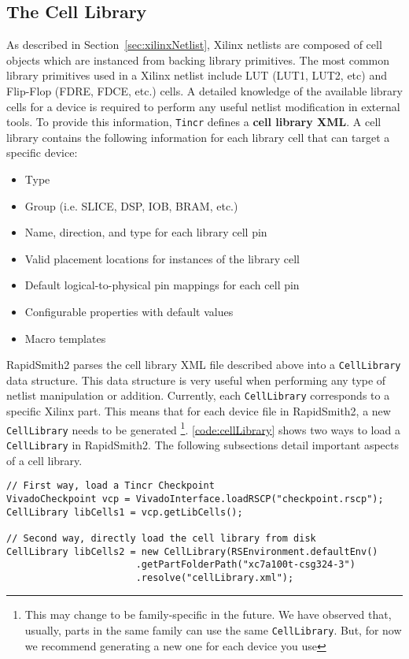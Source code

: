 \subsection{The Cell Library} \label{sec:cellLibraryinDesignSection}
As described in Section~\ref{sec:xilinxNetlist}, Xilinx netlists are composed of
cell objects which are instanced from backing library primitives. The most
common library primitives used in a Xilinx netlist include LUT (LUT1,
LUT2, etc) and Flip-Flop (FDRE, FDCE, etc.) cells. A detailed knowledge of the
available library cells for a device is required to perform any useful netlist
modification in external tools. To provide this information, \texttt{Tincr}
defines a \textbf{cell library XML}. A cell library contains the
following information for each library cell that can target a specific device:

\begin {itemize}
  \item Type
  \item Group (i.e. SLICE, DSP, IOB, BRAM, etc.) 
  \item Name, direction, and type for each library cell pin
  \item Valid placement locations for instances of the library cell
  \item Default logical-to-physical pin mappings for each cell pin
  \item Configurable properties with default values
  \item Macro templates 
\end{itemize}

RapidSmith2 parses the cell library XML file described above into a
\texttt{CellLibrary} data structure. This data structure is very useful when
performing any type of netlist manipulation or addition. Currently, each \texttt{CellLibrary}
corresponds to a specific Xilinx part. This means that for each device file in
RapidSmith2, a new \texttt{CellLibrary} needs to be generated \footnote{This may
change to be family-specific in the future.  We have observed that, usually,
parts in the same family can use the same \texttt{CellLibrary}.  But, for now
we recommend generating a new one for each device you use}.
\autoref{code:cellLibrary} shows two ways to load a \texttt{CellLibrary} in RapidSmith2. The following
subsections detail important aspects of a cell library.

\begin{lstlisting}[xleftmargin=1.5em, framexleftmargin=1.5em, caption=
Loading a CellLibrary in RapidSmith2, label=code:cellLibrary] 
// First way, load a Tincr Checkpoint
VivadoCheckpoint vcp = VivadoInterface.loadRSCP("checkpoint.rscp");
CellLibrary libCells1 = vcp.getLibCells();

// Second way, directly load the cell library from disk
CellLibrary libCells2 = new CellLibrary(RSEnvironment.defaultEnv()
                       .getPartFolderPath("xc7a100t-csg324-3")
                       .resolve("cellLibrary.xml");
\end{lstlisting} 

